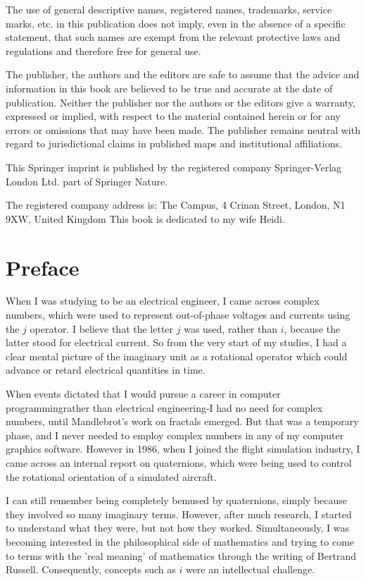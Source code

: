 \documentclass[10pt]{article}
\begin{document}
The use of general descriptive names, registered names, trademarks, service marks, etc. in this publication does not imply, even in the absence of a specific statement, that such names are exempt from the relevant protective laws and regulations and therefore free for general use.

The publisher, the authors and the editors are safe to assume that the advice and information in this book are believed to be true and accurate at the date of publication. Neither the publisher nor the authors or the editors give a warranty, expressed or implied, with respect to the material contained herein or for any errors or omissions that may have been made. The publisher remains neutral with regard to jurisdictional claims in published maps and institutional affiliations.

This Springer imprint is published by the registered company Springer-Verlag London Ltd. part of Springer Nature.

The registered company address is: The Campus, 4 Crinan Street, London, N1 9XW, United Kingdom This book is dedicated to my wife Heidi.

\section{Preface}
When I was studying to be an electrical engineer, I came across complex numbers, which were used to represent out-of-phase voltages and currents using the $j$ operator. I believe that the letter $j$ was used, rather than $i$, because the latter stood for electrical current. So from the very start of my studies, I had a clear mental picture of the imaginary unit as a rotational operator which could advance or retard electrical quantities in time.

When events dictated that I would pursue a career in computer programmingrather than electrical engineering-I had no need for complex numbers, until Mandlebrot's work on fractals emerged. But that was a temporary phase, and I never needed to employ complex numbers in any of my computer graphics software. However in 1986, when I joined the flight simulation industry, I came across an internal report on quaternions, which were being used to control the rotational orientation of a simulated aircraft.

I can still remember being completely bemused by quaternions, simply because they involved so many imaginary terms. However, after much research, I started to understand what they were, but not how they worked. Simultaneously, I was becoming interested in the philosophical side of mathematics and trying to come to terms with the 'real meaning' of mathematics through the writing of Bertrand Russell. Consequently, concepts such as $i$ were an intellectual challenge.
\end{document}
